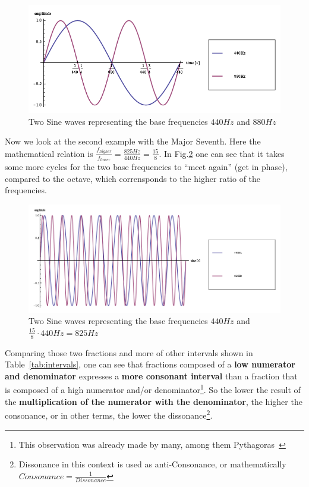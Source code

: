 \documentclass[12pt,a4paper,titlepage,oneside]{report}
\begin{document}
\begin{figure}[!ht]
\includegraphics[width=\textwidth]{images/sine_octave.png}
\centering
\caption{Two Sine waves representing the base frequencies $440Hz$ and $880Hz$}
\label{fig:sine_octave}
\end{figure}

Now we look at the second example with the Major Seventh. Here the mathematical relation is $\frac{f_{higher}}{f_{lower}} = \frac{825Hz}{440Hz} = \frac{15}{8}$. In Fig.\ref{fig:sine_major_seventh} one can see that it takes some more cycles for the two base frequencies to ``meet again'' (get in phase), compared to the octave, which corrensponds to the higher ratio of the frequencies.

\begin{figure}[!ht]
\includegraphics[width=\textwidth]{images/sine_major_seventh.png}
\centering
\caption{Two Sine waves representing the base frequencies $440Hz$ and $\frac{15}{8} \cdot 440Hz = 825Hz$}
\label{fig:sine_major_seventh}
\end{figure}

Comparing those two fractions and more of other intervals shown in Table~\ref{tab:intervals}, one can see that fractions composed of a \textbf{low numerator and denominator} expresses a \textbf{more consonant interval} than a fraction that is composed of a high numerator and/or denominator\footnote{This observation was already made by many, among them Pythagoras~\cite{bib:cons_diss}}. So the lower the result of the \textbf{multiplication of the numerator with the denominator}, the higher the consonance, or in other terms, the lower the dissonance\footnote{Dissonance in this context is used as anti-Consonance, or mathematically $Consonance = \frac{1}{Dissonance}$}.
\end{document}
